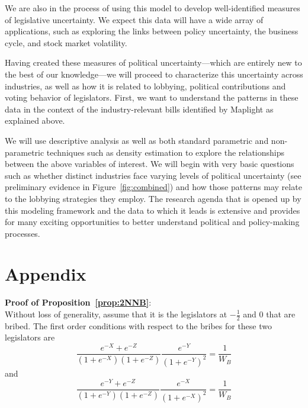 \documentclass[12pt]{article}
\begin{document}
We are also in the process of using this model to develop well-identified measures of legislative uncertainty. We expect this data will have a wide array of applications, such as exploring the links between policy uncertainty, the business cycle, and stock market volatility.

Having created these measures of political uncertainty---which are entirely new to the best of our knowledge---we will proceed to characterize this uncertainty across industries, as well as how it is related to lobbying, political contributions and voting behavior of legislators. First, we want to understand the patterns in these data in the context of the industry-relevant bills identified by Maplight as explained above.

We will use descriptive analysis as well as both standard parametric and non-parametric techniques such as density estimation to explore the relationships between the above variables of interest. We will begin with very basic questions such as whether distinct industries face varying levels of political uncertainty (see preliminary evidence in Figure~\ref{fig:combined}) and how those patterns may relate to the lobbying strategies they employ. The research agenda that is opened up by this modeling framework and the data to which it leads is extensive and provides for many exciting opportunities to better understand political and policy-making processes.

\section*{Appendix}
\label{sec:app}
\noindent \textbf{\hypertarget{Pr_2NNB}{Proof of Proposition~\ref{prop:2NNB}}}: \\
Without loss of generality, assume that it is the legislators at $-\frac{1}{2}$ and $0$ that are bribed. The first order conditions with respect to the bribes for these two legislators are
	\begin{equation}
		\frac{e^{-X} + e^{-Z}}{\left(1+e^{-X}\right)\left(1+e^{-Z}\right)} \frac{e^{-Y}}{\left(1+e^{-Y}\right)^2}= \frac{1}{W_B}
	\end{equation}
	and
	\begin{equation}
		\frac{e^{-Y} + e^{-Z}}{\left(1+e^{-Y}\right)\left(1+e^{-Z}\right)} \frac{e^{-X}}{\left(1+e^{-X}\right)^2}= \frac{1}{W_B}
		\label{eq:base}
	\end{equation}
		
\end{document}
